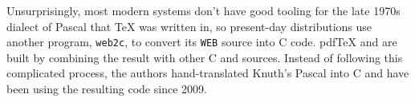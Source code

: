Unsurprisingly, most modern systems don't have good tooling for the late 1970s
dialect of Pascal that \TeX{} was written in,
so present-day distributions use another program,
\texttt{web2c}, to convert its \texttt{WEB} source into C code.
pdf\TeX{} and \XeTeX{} are built by combining the result with other C
and \cpp{} sources.
Instead of following this complicated process,
the \LuaTeX{} authors hand-translated Knuth's Pascal into C
and have been using the resulting code since 2009.\punckern{}

